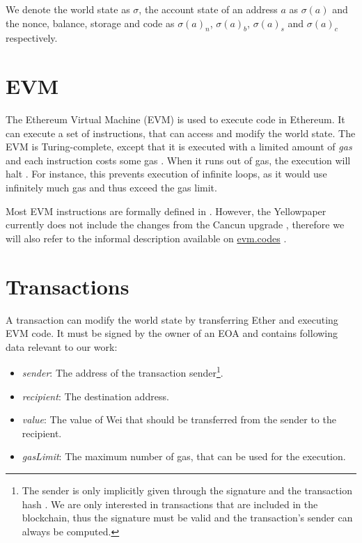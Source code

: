 \documentclass[draft,final]{vutinfth} %
\begin{document}
We denote the world state as $\sigma$, the account state of an address $a$ as $\sigma(a)$ and the nonce, balance, storage and code as $\sigma(a)_n$, $\sigma(a)_b$, $\sigma(a)_s$ and $\sigma(a)_c$ respectively.

\section{EVM}

The Ethereum Virtual Machine (EVM) is used to execute code in Ethereum. It can execute a set of instructions, that can access and modify the world state. The EVM is Turing-complete, except that it is executed with a limited amount of \emph{gas} and each instruction costs some gas \cite{wood_ethereum_2024}. When it runs out of gas, the execution will halt \cite[p.14]{wood_ethereum_2024}. For instance, this prevents execution of infinite loops, as it would use infinitely much gas and thus exceed the gas limit.

Most EVM instructions are formally defined in \cite[p.30-38]{wood_ethereum_2024}. However, the Yellowpaper currently does not include the changes from the Cancun upgrade \cite{noauthor_history_2024}, therefore we will also refer to the informal description available on \href{https://www.evm.codes/}{evm.codes} \cite{noauthor_evm_2024}.

\section{Transactions}

A transaction can modify the world state by transferring Ether and executing EVM code. It must be signed by the owner of an EOA and contains following data relevant to our work:

\begin{itemize}
    \item \emph{sender}: The address of the transaction sender\footnote{The sender is only implicitly given through the signature and the transaction hash \cite[p.25-27]{wood_ethereum_2024}. We are only interested in transactions that are included in the blockchain, thus the signature must be valid and the transaction's sender can always be computed.}.
    \item \emph{recipient}: The destination address.
    \item \emph{value}: The value of Wei that should be transferred from the sender to the recipient.
    \item \emph{gasLimit}: The maximum number of gas, that can be used for the execution.
\end{itemize}
\end{document}
